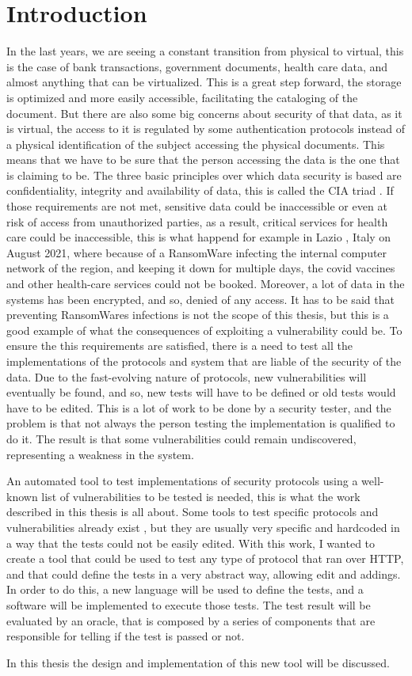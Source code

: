 \chapter{Introduction}
In the last years, we are seeing a constant transition from physical to virtual, this is the case of bank transactions, government documents, health care data, and almost anything that can be virtualized. This is a great step forward, the storage is optimized and more easily accessible, facilitating the cataloging of the document. But there are also some big concerns about security of that data, as it is virtual, the access to it is regulated by some authentication protocols instead of a physical identification of the subject accessing the physical documents. This means that we have to be sure that the person accessing the data is the one that is claiming to be. The three basic principles over which data security is based are confidentiality, integrity and availability of data, this is called the CIA triad \cite{cia_triad}.
If those requirements are not met, sensitive data could be inaccessible or even at risk of access from unauthorized parties, as a result, critical services for health care could be inaccessible, this is what happend for example in Lazio \cite{lazio_hacker_0} \cite{lazio_hacker_1}, Italy on August 2021, where because of a RansomWare infecting the internal computer network of the region, and keeping it down for multiple days, the covid vaccines and other health-care services could not be booked. Moreover, a lot of data in the systems has been encrypted, and so, denied of any access. It has to be said that preventing RansomWares infections is not the scope of this thesis, but this is a good example of what the consequences of exploiting a vulnerability could be.
To ensure the this requirements are satisfied, there is a need to test all the implementations of the protocols and system that are liable of the security of the data. Due to the fast-evolving nature of protocols, new vulnerabilities will eventually be found, and so, new tests will have to be defined or old tests would have to be edited. This is a lot of work to be done by a security tester, and the problem is that not always the person testing the implementation is qualified to do it. The result is that some vulnerabilities could remain undiscovered, representing a weakness in the system.

An automated tool to test implementations of security protocols using a well-known list of vulnerabilities to be tested is needed, this is what the work described in this thesis is all about. Some tools to test specific protocols and vulnerabilities already exist \cite{wendy_barreto}\cite{claudio_grisenti}, but they are usually very specific and hardcoded in a way that the tests could not be easily edited. With this work, I wanted to create a tool that could be used to test any type of protocol that ran over HTTP, and that could define the tests in a very abstract way, allowing edit and addings. In order to do this, a new language will be used to define the tests, and a software will be implemented to execute those tests. The test result will be evaluated by an oracle, that is composed by a series of components that are responsible for telling if the test is passed or not.

In this thesis the design and implementation of this new tool will be discussed.



